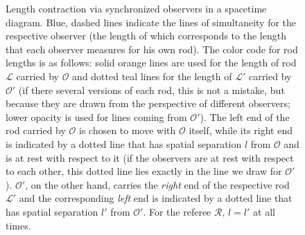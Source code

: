 \documentclass[../relativity_main.tex]{subfiles}
\begin{document}
\begin{figure}
	\caption{Length contraction via synchronized observers in a spacetime diagram. Blue, dashed lines indicate the lines of simultaneity for the respective observer (the length of which corresponds to the length that each observer measures for his own rod).
	The color code for rod lengths is as follows: solid orange lines are used for the length of rod $\mathcal{L}$ carried by $\mathcal{O}$ and dotted teal lines for the length of $\mathcal{L}'$ carried by $\mathcal{O}'$ (if there several versions of each rod, this is not a mistake, but because they are drawn from the perspective of different observers; lower opacity is used for lines coming from $\mathcal{O}'$).
	The left end of the rod carried by $\mathcal{O}$ is chosen to move with $\mathcal{O}$ itself, while its right end is indicated by a dotted line that has spatial separation $l$ from $\mathcal{O}$ and is at rest with respect to it (if the observers are at rest with respect to each other, this dotted line lies exactly in the line we draw for $\mathcal{O}'$). $\mathcal{O}'$, on the other hand, carries the \emph{right} end of the respective rod $\mathcal{L}'$ and the corresponding \emph{left} end is indicated by a dotted line that has spatial separation $l'$ from $\mathcal{O}'$. For the referee $\mathcal{R}$, $l = l'$ at all times.
	}
	\label{fig:length_contraction}
\end{figure}
\end{document}
